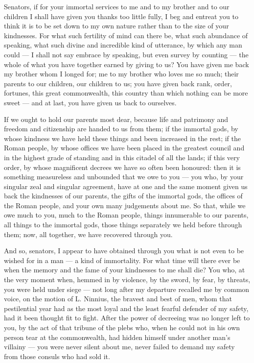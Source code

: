 
 Senators, if for your immortal services to me and to my brother and to our children I shall have given you thanks too little fully, I beg and entreat you to think it is to be set down to my own nature rather than to the size of your kindnesses. For what such fertility of mind can there be, what such abundance of speaking, what such divine and incredible kind of utterance, by which any man could --- I shall not say embrace by speaking, but even survey by counting --- the whole of what you have together earned by giving to us? You have given me back my brother whom I longed for; me to my brother who loves me so much; their parents to our children, our children to us; you have given back rank, order, fortunes, this great commonwealth, this country than which nothing can be more sweet --- and at last, you have given us back to ourselves.

 If we ought to hold our parents most dear, because life and patrimony and freedom and citizenship are handed to us from them; if the immortal gods, by whose kindness we have held these things and been increased in the rest; if the Roman people, by whose offices we have been placed in the greatest council and in the highest grade of standing and in this citadel of all the lands; if this very order, by whose magnificent decrees we have so often been honoured: then it is something measureless and unbounded that we owe to you --- you who, by your singular zeal and singular agreement, have at one and the same moment given us back the kindnesses of our parents, the gifts of the immortal gods, the offices of the Roman people, and your own many judgements about me. So that, while we owe much to you, much to the Roman people, things innumerable to our parents, all things to the immortal gods, those things separately we held before through them; now, all together, we have recovered through you.

 And so, senators, I appear to have obtained through you what is not even to be wished for in a man --- a kind of immortality. For what time will there ever be when the memory and the fame of your kindnesses to me shall die? You who, at the very moment when, hemmed in by violence, by the sword, by fear, by threats, you were held under siege --- not long after my departure recalled me by common voice, on the motion of L. Ninnius, the bravest and best of men, whom that pestilential year had as the most loyal and the least fearful defender of my safety, had it been thought fit to fight. After the power of decreeing was no longer left to you, by the act of that tribune of the plebs who, when he could not in his own person tear at the commonwealth, had hidden himself under another man's villainy --- you were never silent about me, never failed to demand my safety from those consuls who had sold it.

